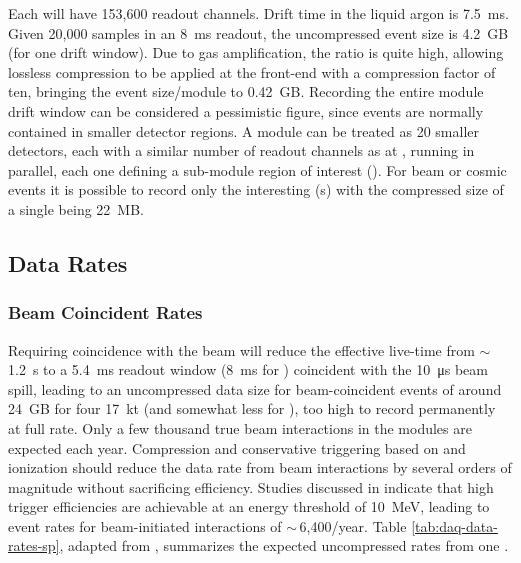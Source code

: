 Each  will have 153,600 readout channels. Drift time in the liquid argon is \SI{7.5}{ms}. Given 20,000 samples in an \SI{8}{ms} readout, the uncompressed event size is \SI{4.2}{GB} (for one drift window).  Due to gas amplification, the  ratio is quite high, allowing lossless compression to be applied at the front-end  with a compression factor of ten, bringing the event size/module to \SI{.42}{GB}. Recording the entire module drift window can be considered a pessimistic figure,  since events are normally contained in smaller detector regions. A   module can be treated as 20 smaller  detectors, each with a similar number  of readout channels as   %
at , running in parallel, each one defining a sub-module region of interest  (). For beam or cosmic events it is possible to record only the interesting (s) with the compressed size of a single  being \SI{22}{MB}.

\subsection{Data Rates}
\subsubsection{Beam Coincident Rates}

Requiring  coincidence with the  beam will reduce the effective live-time from $\sim\,$\SI{1.2}{s}  to a \SI{5.4}{ms}  readout window (\SI{8}{ms} for ) coincident with the \SI{10}{\micro\second} beam spill, leading to an uncompressed data size for beam-coincident events of around \SI{24}{GB} for four \SI{17}{kt}  (and somewhat less for ), too high to record permanently at full rate.
Only a few thousand true beam interactions in the  modules are expected each year.  Compression and conservative triggering based on  and ionization should reduce the data rate from beam interactions by several orders of magnitude without sacrificing efficiency.  Studies discussed in %
\spchdaq{} 
indicate that high trigger efficiencies are achievable at an energy threshold of \SI{10}{MeV}, leading to event rates for beam-initiated  interactions of $\sim\,$6,400/year.
Table \ref{tab:daq-data-rates-sp}, adapted from \spchdaq{}, %
 summarizes the expected uncompressed rates from one . 

